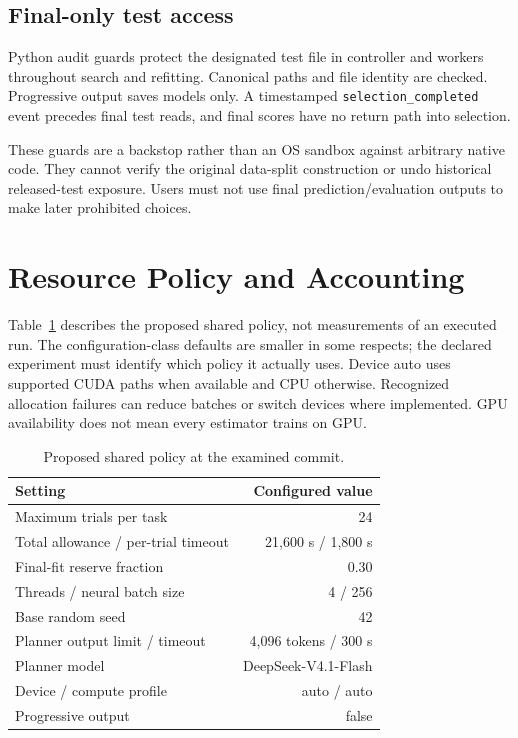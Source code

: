 \documentclass[11pt,a4paper]{article}
\newcommand{\code}[1]{\texttt{\small #1}}
\begin{document}
\subsection{Final-only test access}
Python audit guards protect the designated test file in controller and workers throughout search and refitting. Canonical paths and file identity are checked. Progressive output saves models only. A timestamped \code{selection\_completed} event precedes final test reads, and final scores have no return path into selection.

These guards are a backstop rather than an OS sandbox against arbitrary native code. They cannot verify the original data-split construction or undo historical released-test exposure. Users must not use final prediction/evaluation outputs to make later prohibited choices.

\section{Resource Policy and Accounting}
Table~\ref{tab:policy} describes the proposed shared policy, not measurements of an executed run. The configuration-class defaults are smaller in some respects; the declared experiment must identify which policy it actually uses. Device auto uses supported CUDA paths when available and CPU otherwise. Recognized allocation failures can reduce batches or switch devices where implemented. GPU availability does not mean every estimator trains on GPU.
\begin{table}[ht]\centering
\caption{Proposed shared policy at the examined commit.}\label{tab:policy}
\begin{tabular}{lr}\toprule Setting & Configured value\\\midrule
Maximum trials per task & 24\\
Total allowance / per-trial timeout & 21,600 s / 1,800 s\\
Final-fit reserve fraction & 0.30\\
Threads / neural batch size & 4 / 256\\
Base random seed & 42\\
Planner output limit / timeout & 4,096 tokens / 300 s\\
Planner model & DeepSeek-V4.1-Flash\\
Device / compute profile & auto / auto\\
Progressive output & false\\\bottomrule\end{tabular}
\end{table}
\end{document}
